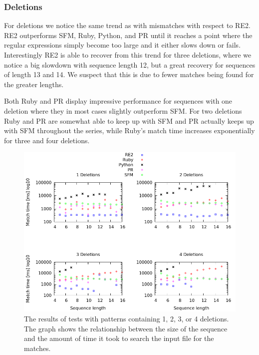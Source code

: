 \documentclass[12pt]{article}
\theoremstyle{definition}
\begin{document}
\subsubsection{Deletions}

For deletions we notice the same trend as with mismatches with respect to RE2. RE2 outperforms SFM, Ruby, Python, and PR until it reaches a point where the regular expressions simply become too large and it either slows down or fails. 
Interestingly RE2 is able to recover from this trend for three deletions, where we notice a big slowdown with sequence length 12, but a great recovery for sequences of length 13 and 14. We suspect that this is due to fewer matches being found for the greater lengths.

Both Ruby and PR display impressive performance for sequences with one deletion where they in most cases slightly outperform SFM. For two deletions Ruby and PR are somewhat able to keep up with SFM and PR actually keeps up with SFM throughout the series, while Ruby's match time increases exponentially for three and four deletions.

\begin{figure}[H]
	\begin{center}
		\includegraphics[scale=0.55]{graphs/deletions.png}	
	\end{center}
	\caption{The results of tests with patterns containing 1, 2, 3, or 4 deletions. The graph shows the relationship between the size of the sequence and the amount of time it took to search the input file for the matches.}
	\label{graph:cases:deletions}
\end{figure}
\end{document}
